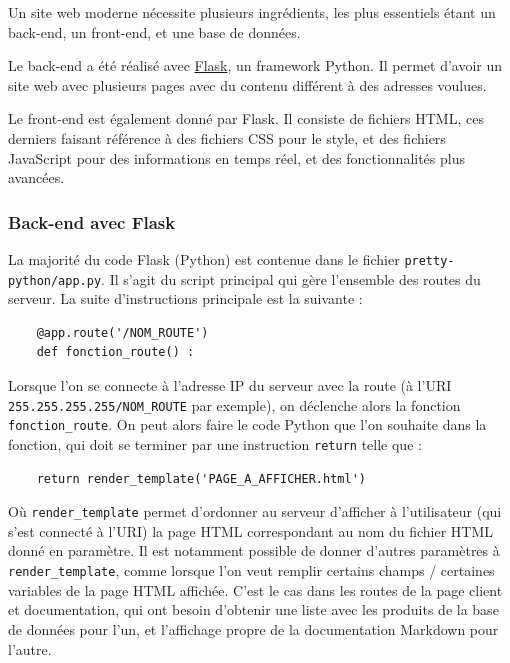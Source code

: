 \documentclass[a4paper,12pt]{report}  %
\begin{document}
Un site web moderne nécessite plusieurs ingrédients, les plus essentiels étant un back-end, un front-end, et une base de données. 

Le back-end a été réalisé avec \href{https://flask.palletsprojects.com/en/stable/}{Flask}, un framework Python. Il permet d'avoir un site web avec plusieurs pages avec du contenu différent à des adresses voulues. 

Le front-end est également donné par Flask. Il consiste de fichiers HTML, ces derniers faisant référence à des fichiers CSS pour le style, et des fichiers JavaScript pour des informations en temps réel, et des fonctionnalités plus avancées. 

\subsubsection{Back-end avec Flask}

La majorité du code Flask (Python) est contenue dans le fichier \texttt{pretty-python/app.py}. Il s’agit du script principal qui gère l’ensemble des routes du serveur. 
La suite d’instructions principale est la suivante : 

\begin{lstlisting}
	@app.route('/NOM_ROUTE')
	def fonction_route() :
\end{lstlisting}

Lorsque l’on se connecte à l’adresse IP du serveur avec la route (à l’URI \texttt{255.255.255.255/NOM\_ROUTE} par exemple), on déclenche alors la fonction \texttt{fonction\_route}.
On peut alors faire le code Python que l’on souhaite dans la fonction, qui doit se terminer par une instruction \texttt{return} telle que :

\begin{lstlisting}
	return render_template('PAGE_A_AFFICHER.html')
\end{lstlisting}

Où \texttt{render\_template} permet d’ordonner au serveur d’afficher à l’utilisateur (qui s’est connecté à l’URI) la page HTML correspondant au nom du fichier HTML donné en paramètre. Il est notamment possible de donner d’autres paramètres à \texttt{render\_template}, comme lorsque l’on veut remplir certains champs / certaines variables de la page HTML affichée. C’est le cas dans les routes de la page client et documentation, qui ont besoin d’obtenir une liste avec les produits de la base de données pour l’un, et l’affichage propre de la documentation Markdown pour l’autre.
\end{document}

